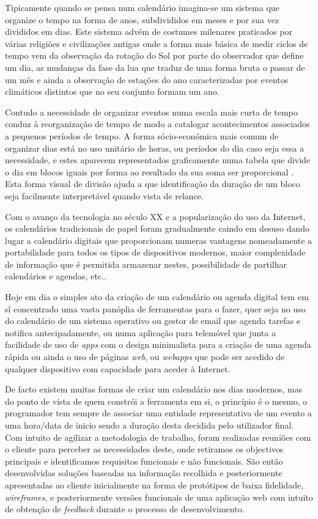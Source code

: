 \documentclass[11pt, twoside]{report}
\begin{document}
	Tipicamente quando se pensa num calendário imagina-se um sistema que organize o tempo na forma de anos, subdivididos em meses e por sua vez divididos em dias.
	Este sistema advém de costumes milenares praticados por várias religiões e civilizações antigas onde a forma mais básica de medir ciclos de tempo vem da observação da rotação do Sol por parte do observador que define um dia, as mudanças da fase da lua que traduz de uma forma bruta o passar de um mês e ainda a observação de estações do ano caracterizadas por eventos climáticos distintos que no seu conjunto formam um ano\cite{stray_mayan_2007}.
	
	Contudo a necessidade de organizar eventos numa escala mais curta de tempo conduz à reorganização de tempo de modo a catalogar acontecimentos associados a pequenos períodos de tempo. 
	A forma sócio-económica mais comum de organizar dias está no uso unitário de horas, ou períodos do dia caso seja essa a necessidade, e estes aparecem representados graficamente numa tabela\cite{10.1145/2702613.2732512} que divide o dia em blocos iguais por forma ao resultado da sua soma ser proporcional \cite{Russell1910-RUSPMV}. 
	Esta forma visual de divisão ajuda a que identificação da duração de um bloco seja facilmente interpretável quando vista de relance. 
	
	Com o avanço da tecnologia no século XX e a popularização do uso da Internet, os calendários tradicionais de papel foram gradualmente caindo em desuso dando lugar a calendário digitais que proporcionam numeras vantagens nomeadamente a portabilidade para todos os tipos de dispositivos modernos, maior complexidade de informação que é permitida armazenar nestes, possibilidade de partilhar calendários e agendas, etc.. 
	
	Hoje em dia o simples ato da criação de um calendário ou agenda digital tem em sî concentrado uma vasta panóplia de ferramentas para o fazer, quer seja no uso do calendário de um sistema operativo ou gestor de email que agenda tarefas e notifica antecipadamente, ou numa aplicação para telemóvel que junta a facilidade de uso de \textit{apps} com o design minimalista para a criação de uma agenda rápida ou ainda o uso de páginas \textit{web}, ou \textit{webapps} que pode ser acedido de qualquer dispositivo com capacidade para aceder à Internet. 
	
	De facto existem muitas formas de criar um calendário nos dias modernos, mas do ponto de vista de quem constrói a ferramenta em si, o princípio é o mesmo, o programador tem sempre de associar uma entidade representativa de um evento a uma hora/data de inicio sendo a duração desta decidida pelo utilizador final. 
	Com intuito de agilizar a metodologia de trabalho, foram realizadas reuniões com o cliente para perceber as necessidades deste, onde retiramos os objectivos principais e identificamos requisitos funcionais e não funcionais.
	São então desenvolvidas soluções baseadas na informação recolhida e posteriormente apresentadas ao cliente inicialmente na forma de protótipos de baixa fidelidade, \textit{wireframes}, e posteriormente versões funcionais de uma aplicação web com intuito de obtenção de \textit{feedback} durante o processo de desenvolvimento.
	
\end{document}
